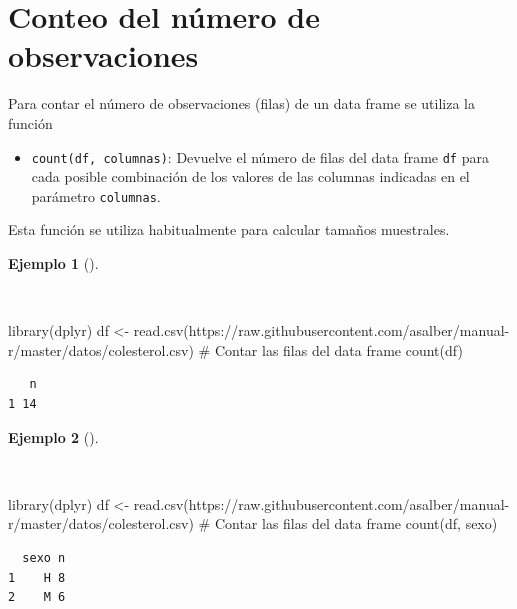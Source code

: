 \documentclass[
  spanish,
  a4paper,
]{scrreport}
\newenvironment{Shaded}{\begin{snugshade}}{\end{snugshade}}
\newcommand{\CommentTok}[1]{\textcolor[rgb]{0.37,0.37,0.37}{#1}}
\newcommand{\FunctionTok}[1]{\textcolor[rgb]{0.28,0.35,0.67}{#1}}
\newcommand{\NormalTok}[1]{\textcolor[rgb]{0.00,0.23,0.31}{#1}}
\newcommand{\OtherTok}[1]{\textcolor[rgb]{0.00,0.23,0.31}{#1}}
\newcommand{\StringTok}[1]{\textcolor[rgb]{0.13,0.47,0.30}{#1}}
\providecommand{\tightlist}{%
  \setlength{\itemsep}{0pt}\setlength{\parskip}{0pt}}
\theoremstyle{definition}
\theoremstyle{definition}
\newtheorem{example}{Ejemplo}[chapter]
\theoremstyle{remark}
\begin{document}
\section{Conteo del número de
observaciones}\label{conteo-del-nuxfamero-de-observaciones}

Para contar el número de observaciones (filas) de un data frame se
utiliza la función

\begin{itemize}
\tightlist
\item
  \texttt{count(df,\ columnas)}: Devuelve el número de filas del data
  frame \texttt{df} para cada posible combinación de los valores de las
  columnas indicadas en el parámetro \texttt{columnas}.
\end{itemize}

Esta función se utiliza habitualmente para calcular tamaños muestrales.

\begin{example}[]\protect\hypertarget{exm-count-1}{}\label{exm-count-1}

~

\begin{Shaded}
\begin{Highlighting}[]
\FunctionTok{library}\NormalTok{(dplyr)}
\NormalTok{df }\OtherTok{\textless{}{-}} \FunctionTok{read.csv}\NormalTok{(}\StringTok{\textquotesingle{}https://raw.githubusercontent.com/asalber/manual{-}r/master/datos/colesterol.csv\textquotesingle{}}\NormalTok{)}
\CommentTok{\# Contar las filas del data frame}
\FunctionTok{count}\NormalTok{(df)}
\end{Highlighting}
\end{Shaded}

\begin{verbatim}
   n
1 14
\end{verbatim}

\end{example}

\begin{example}[]\protect\hypertarget{exm-count-2}{}\label{exm-count-2}

~

\begin{Shaded}
\begin{Highlighting}[]
\FunctionTok{library}\NormalTok{(dplyr)}
\NormalTok{df }\OtherTok{\textless{}{-}} \FunctionTok{read.csv}\NormalTok{(}\StringTok{\textquotesingle{}https://raw.githubusercontent.com/asalber/manual{-}r/master/datos/colesterol.csv\textquotesingle{}}\NormalTok{)}
\CommentTok{\# Contar las filas del data frame}
\FunctionTok{count}\NormalTok{(df, sexo)}
\end{Highlighting}
\end{Shaded}

\begin{verbatim}
  sexo n
1    H 8
2    M 6
\end{verbatim}

\end{example}
\end{document}
